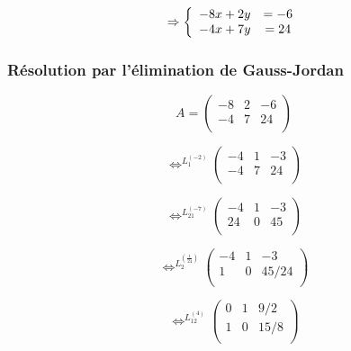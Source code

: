         \begin{equation*}
            \Rightarrow \left \{
               \begin{array}{r c l}
                  -8x + 2y & = -6 \\
                  -4x + 7y & = 24
               \end{array}
           \right .
        \end{equation*}
        
        \subsubsection{Résolution par l'élimination de Gauss-Jordan}
        
            \[A=\left(
             \begin{array}{cc|c}
                -8 & 2 & -6\\
                -4 & 7 & 24\\
             \end{array}\right)
            \]
            
            \[\Leftrightarrow^{L_1^{(-2)}} \left(
             \begin{array}{cc|c}
                -4 & 1 & -3\\
                -4 & 7 & 24\\
             \end{array}\right)
            \]
            
            \[\Leftrightarrow^{L_{21}^{(-7)}} \left(
             \begin{array}{cc|c}
                -4 & 1 & -3\\
                24 & 0 & 45\\
             \end{array}\right)
            \]
            
            \[\Leftrightarrow^{L_2^{(\frac{1}{24})}} \left(
             \begin{array}{cc|c}
                -4 & 1 & -3\\
                 1 & 0 & 45/24\\
             \end{array}\right)
            \]
            
            \[\Leftrightarrow^{L_{12}^{(4)}} \left(
             \begin{array}{cc|c}
                 0 & 1 & 9/2\\
                 1 & 0 & 15/8\\
             \end{array}\right)
            \]
            
